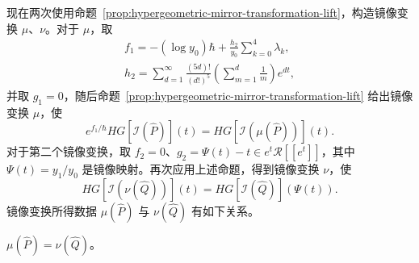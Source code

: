 现在两次使用命题~\ref{prop:hypergeometric-mirror-transformation-lift}，构造镜像变换 $\mu$、$\nu$。对于 $\mu$，取
\begin{equation}\label{eq:quintic-first-mirror-transformation-parameters}
\begin{gathered}
f_1=-(\log y_0)\hbar+\frac{h_2}{y_0}\sum_{k=0}^4\lambda_k,\\
h_2=\sum_{d=1}^{\infty}\frac{(5d)!}{(d!)^5}
\left(\sum_{m=1}^d\frac1m\right)e^{dt},
\end{gathered}
\end{equation}
并取 $g_1=0$，随后命题~\ref{prop:hypergeometric-mirror-transformation-lift} 给出镜像变换 $\mu$，使
\begin{equation}\label{eq:quintic-first-mirror-transformation}
e^{f_1/\hbar}HG[\mathcal I(\widehat P)](t)
=HG[\mathcal I(\mu(\widehat P))](t).
\end{equation}
对于第二个镜像变换，取 $f_2=0$、$g_2=\Psi(t)-t\in e^t\mathcal R[[e^t]]$，其中 $\Psi(t)=y_1/y_0$ 是镜像映射。再次应用上述命题，得到镜像变换 $\nu$，使
\begin{equation}\label{eq:quintic-second-mirror-transformation}
HG[\mathcal I(\nu(\widehat Q))](t)
=HG[\mathcal I(\widehat Q)](\Psi(t)).
\end{equation}
镜像变换所得数据 $\mu(\widehat P)$ 与 $\nu(\widehat Q)$ 有如下关系。
\begin{theorem}\label{thm:quintic-transformed-euler-data-equality}
$\mu(\widehat P)=\nu(\widehat Q)$。
\end{theorem}
